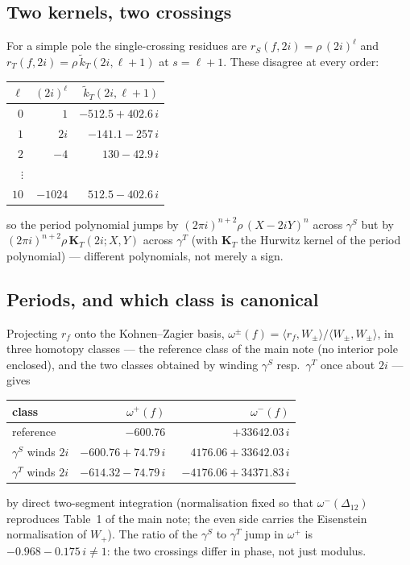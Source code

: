 \documentclass[11pt]{article}
\begin{document}
\subsection{Two kernels, two crossings}
For a simple pole the single-crossing residues are
$r_S(f,2i) = \rho\,(2i)^{\ell}$ and $r_T(f,2i) = \rho\,
\widetilde{k}_T(2i,\ell+1)$ at $s=\ell+1$. These disagree at every
order:
\begin{center}
\begin{tabular}{r|rr}
$\ell$ & $(2i)^\ell$ & $\widetilde{k}_T(2i,\ell+1)$\\\hline
$0$    & $1$      & $-512.5 + 402.6\,i$\\
$1$    & $2i$     & $-141.1 - 257\,i$\\
$2$    & $-4$     & $130 - 42.9\,i$\\
$\vdots$ &        & \\
$10$   & $-1024$  & $512.5 - 402.6\,i$
\end{tabular}
\end{center}
so the period polynomial jumps by $(2\pi i)^{n+2}\rho\,(X-2iY)^{n}$
across $\gamma^S$ but by $(2\pi i)^{n+2}\rho\,\mathbf K_T(2i;X,Y)$ across
$\gamma^T$ (with $\mathbf K_T$ the Hurwitz kernel of the period
polynomial) --- different polynomials, not merely a sign.

\subsection{Periods, and which class is canonical}
Projecting $r_f$ onto the Kohnen--Zagier basis, $\omega^\pm(f) =
\langle r_f, W_\pm\rangle/\langle W_\pm,W_\pm\rangle$, in three homotopy
classes --- the reference class of the main note (no interior pole
enclosed), and the two classes obtained by winding $\gamma^S$ resp.\
$\gamma^T$ once about $2i$ --- gives
\begin{center}
\begin{tabular}{l|rr}
class & $\omega^+(f)$ & $\omega^-(f)$\\\hline
reference               & $-600.76$            & $+33642.03\,i$\\
$\gamma^S$ winds $2i$   & $-600.76 + 74.79\,i$ & $\phantom{-}4176.06 + 33642.03\,i$\\
$\gamma^T$ winds $2i$   & $-614.32 - 74.79\,i$ & $-4176.06 + 34371.83\,i$
\end{tabular}
\end{center}
by direct two-segment integration (normalisation fixed so that
$\omega^-(\Delta_{12})$ reproduces Table~1 of the main note; the even
side carries the Eisenstein normalisation of $W_+$). The ratio of the
$\gamma^S$ to $\gamma^T$ jump in $\omega^+$ is $-0.968 - 0.175\,i \neq
1$: the two crossings differ in phase, not just modulus.
\end{document}
